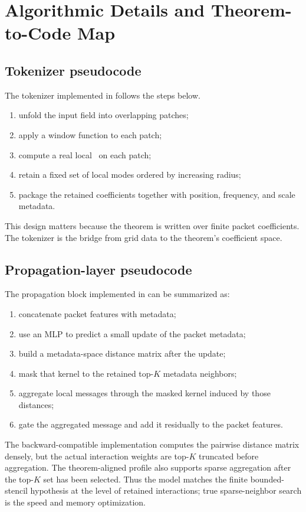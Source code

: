 \section{Algorithmic Details and Theorem-to-Code Map}
\label{app:algorithms}

\subsection{Tokenizer pseudocode}

The tokenizer implemented in  follows the steps below.

\begin{enumerate}
\item unfold the input field into overlapping patches;
\item apply a window function to each patch;
\item compute a real local \FFT\ on each patch;
\item retain a fixed set of local modes ordered by increasing radius;
\item package the retained coefficients together with position, frequency, and scale metadata.
\end{enumerate}

This design matters because the theorem is written over finite packet coefficients. The tokenizer is the bridge from grid data to the theorem's coefficient space.

\subsection{Propagation-layer pseudocode}

The propagation block implemented in  can be summarized as:
\begin{enumerate}
\item concatenate packet features with metadata;
\item use an MLP to predict a small update of the packet metadata;
\item build a metadata-space distance matrix after the update;
\item mask that kernel to the retained top-$K$ metadata neighbors;
\item aggregate local messages through the masked kernel induced by those distances;
\item gate the aggregated message and add it residually to the packet features.
\end{enumerate}
The backward-compatible implementation computes the pairwise distance matrix densely, but the actual interaction weights are top-$K$ truncated before aggregation. The theorem-aligned profile also supports sparse aggregation after the top-$K$ set has been selected. Thus the model matches the finite bounded-stencil hypothesis at the level of retained interactions; true sparse-neighbor search is the speed and memory optimization.

